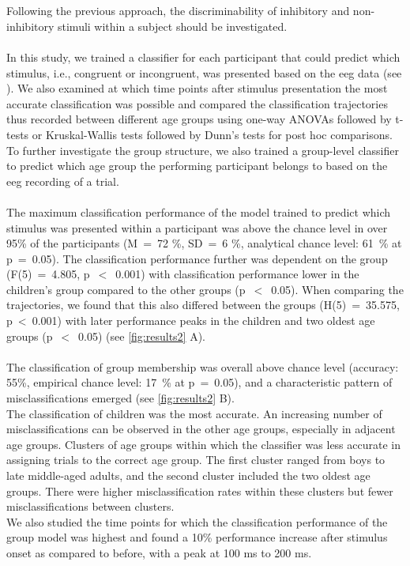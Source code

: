 \\
\\
Following the previous approach, the discriminability of inhibitory and non-inhibitory stimuli within a subject should be investigated.\\
\\
In this study, we trained a classifier for each participant that could predict which stimulus, i.e., congruent or incongruent, was presented based on the \gls{eeg} data (see ). We also examined at which time points after stimulus presentation the most accurate classification was possible and compared the classification trajectories thus recorded between different age groups using one-way ANOVAs followed by t-tests or Kruskal-Wallis tests followed by Dunn’s tests for post hoc comparisons.\\
To further investigate the group structure, we also trained a group-level classifier to predict which age group the performing participant belongs to based on the \gls{eeg} recording of a trial.\\
\\
The maximum classification performance of the model trained to predict which stimulus was presented within a participant was above the chance level in over 95\% of the participants (M~=~72 \%, SD~=~6 \%,  analytical chance level: 61~\% at p~=~0.05). The classification performance further was dependent on the group (F(5)~=~4.805, p~$<$~0.001) with classification performance lower in the children's group compared to the other groups (p~$<$~0.05). When comparing the trajectories, we found that this also differed between the groups (H(5)~=~35.575, p~<~0.001) with later performance peaks in the children and two oldest age groups (p~$<$~0.05) (see \autoref{fig:results2} A).\\
\\
The classification of group membership was overall above chance level (accuracy: 55\%, empirical chance level: 17~\% at p~=~0.05), and a characteristic pattern of misclassifications emerged (see \autoref{fig:results2} B).\\
The classification of children was the most accurate. An increasing number of misclassifications can be observed in the other age groups, especially in adjacent age groups. Clusters of age groups within which the classifier was less accurate in assigning trials to the correct age group. The first cluster ranged from boys to late middle-aged adults, and the second cluster included the two oldest age groups. There were higher misclassification rates within these clusters but fewer misclassifications between clusters.\\
We also studied the time points for which the classification performance of the group model was highest and found a 10\% performance increase after stimulus onset as compared to before, with a peak at 100 ms to 200 ms.

